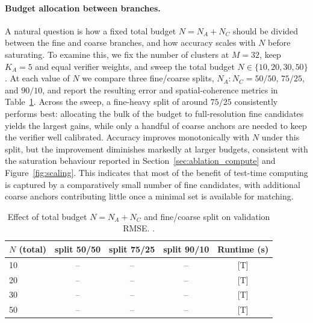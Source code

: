 \documentclass[preprint,12pt]{elsarticle}
\begin{document}
\paragraph{Budget allocation between branches.} A natural question is how a fixed total budget $N=N_A+N_C$ should be divided between the fine and coarse branches, and how accuracy scales with $N$ before saturating. To examine this, we fix the number of clusters at $M=32$, keep $K_A=5$ and equal verifier weights, and sweep the total budget $N \in \{10,20,30,50\}$. At each value of $N$ we compare three fine/coarse splits, $N_A{:}N_C = 50/50$, $75/25$, and $90/10$, and report the resulting error and spatial-coherence metrics in Table~\ref{tab:budget_split}. Across the sweep, a fine-heavy split of around $75/25$ consistently performs best: allocating the bulk of the budget to full-resolution fine candidates yields the largest gains, while only a handful of coarse anchors are needed to keep the verifier well calibrated. Accuracy improves monotonically with $N$ under this split, but the improvement diminishes markedly at larger budgets, consistent with the saturation behaviour reported in Section~\ref{sec:ablation_compute} and Figure~\ref{fig:scaling}. This indicates that most of the benefit of test-time computing is captured by a comparatively small number of fine candidates, with additional coarse anchors contributing little once a minimal set is available for matching.
\begin{table}[H]
\centering
\caption{Effect of total budget $N{=}N_A{+}N_C$ and fine/coarse split on validation RMSE. .}
\begin{tabular}{lcccc}
\toprule
$N$ (total) & split 50/50 & split 75/25 & split 90/10 & Runtime (s) \\
\midrule
10 & --& --& --& [T] \\
20 & --& --& --& [T] \\
30 & --& --& --& [T] \\
50 & --& --& --& [T] \\
\bottomrule
\end{tabular}
\label{tab:budget_split}
\end{table}
\end{document}
